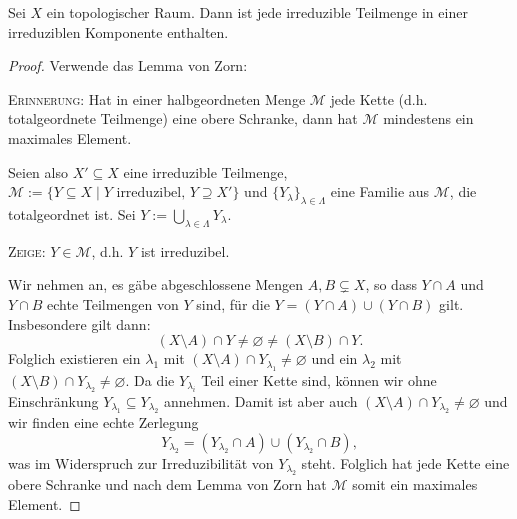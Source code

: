 \documentclass[a4paper,12pt]{scrbook}
\theoremstyle{keinenummern} %
\theoremstyle{mitnummern}
\theoremstyle{unserbeweis}
\newtheorem{proof}{Beweis}
\def\M{\mathcal{M}}
\newcommand{\leer}{\ensuremath{\varnothing}}
\begin{document}
\begin{prop}\label{1.2.10} Sei $X$ ein topologischer Raum. Dann ist jede irreduzible Teilmenge in einer irreduziblen Komponente enthalten.\end{prop}
\begin{proof} Verwende das Lemma von Zorn:

{\scshape Erinnerung:} Hat in einer halbgeordneten Menge $\M$ jede Kette (d.h. totalgeordnete Teilmenge) eine obere Schranke, dann hat $\M$ mindestens ein maximales Element.

Seien also $X'\subseteq X$ eine irreduzible Teilmenge, $\M:=\{Y\subseteq X\mid Y\text{ irreduzibel, }Y\supseteq X'\}$ und $\{Y_{\lambda}\}_{\lambda\in\Lambda}$ eine Familie aus $\M$, die totalgeordnet ist. Sei $\displaystyle Y:=\bigcup_{\lambda\in\Lambda}Y_{\lambda}$.

{\scshape Zeige:} $Y\in\M$, d.h. $Y$ ist irreduzibel.

Wir nehmen an, es gäbe abgeschlossene Mengen $A,B\subsetneq X$, so dass $Y\cap A$ und $Y\cap B$ echte Teilmengen von $Y$ sind, für die $Y=(Y\cap A)\cup(Y\cap B)$ gilt. Insbesondere gilt dann:
\[(X\setminus A)\cap Y\neq\leer\neq (X\setminus B)\cap Y.\]
Folglich existieren ein $\lambda_{1}$ mit $(X\setminus A)\cap Y_{\lambda_{1}}\neq\leer$ und ein $\lambda_{2}$ mit $(X\setminus B)\cap Y_{\lambda_{2}}\neq\leer$. Da die $Y_{\lambda_{i}}$ Teil einer Kette sind, können wir ohne Einschränkung $Y_{\lambda_{1}}\subseteq Y_{\lambda_{2}}$ annehmen. Damit ist aber auch $(X\setminus A)\cap Y_{\lambda_{2}}\neq\leer$ und wir finden eine echte Zerlegung
\[Y_{\lambda_{2}}=(Y_{\lambda_{2}}\cap A)\cup(Y_{\lambda_{2}}\cap B),\]
was im Widerspruch zur Irreduzibilität von $Y_{\lambda_{2}}$ steht. Folglich hat jede Kette eine obere Schranke und nach dem Lemma von Zorn hat $\M$ somit ein maximales Element.
\end{proof}
\end{document}

